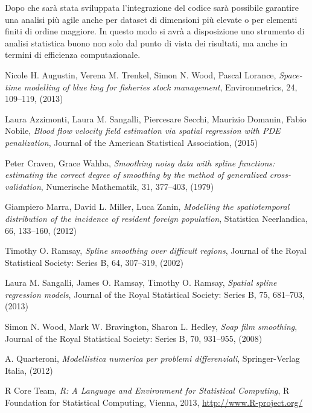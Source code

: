 \documentclass[a4paper,11pt,twoside,openright]{book}							%
\begin{document}
Dopo che sarà stata sviluppata l'integrazione del codice sarà possibile garantire una analisi più agile anche per dataset di dimensioni più elevate o per elementi finiti di ordine maggiore. In questo modo si avrà a disposizione uno strumento di analisi statistica buono non solo dal punto di vista dei risultati, ma anche in termini di efficienza computazionale.


\begin{thebibliography}{99}

Nicole H. Augustin, Verena M. Trenkel, Simon N. Wood, Pascal Lorance, \emph{Space-time modelling of blue ling for fisheries stock management}, Environmetrics, 24, 109–119, (2013)

Laura Azzimonti, Laura M. Sangalli, Piercesare Secchi, Maurizio Domanin, Fabio Nobile, \emph{Blood flow velocity field estimation via spatial regression with PDE penalization}, Journal of the American Statistical Association, (2015)

Peter Craven, Grace Wahba, \emph{Smoothing noisy data with spline functions: estimating the correct degree of smoothing by the method of generalized cross-validation}, Numerische Mathematik, 31, 377–403, (1979)

Giampiero Marra, David L. Miller, Luca Zanin, \emph{Modelling the spatiotemporal distribution of the incidence of resident foreign population}, Statistica Neerlandica, 66, 133–160, (2012)

Timothy O. Ramsay, \emph{Spline smoothing over difficult regions}, Journal of the Royal Statistical Society: Series B, 64, 307–319, (2002)

Laura M. Sangalli, James O. Ramsay, Timothy O. Ramsay, \emph{Spatial spline regression models}, Journal of the Royal Statistical Society: Series B, 75, 681–703, (2013)

Simon N. Wood, Mark W. Bravington, Sharon L. Hedley, \emph{Soap film smoothing}, Journal of the Royal Statistical Society: Series B, 70, 931–955, (2008)

A. Quarteroni, \emph{Modellistica numerica per problemi differenziali}, Springer-Verlag Italia, (2012)

R Core Team, \emph{R: A Language and Environment for Statistical Computing}, R Foundation for Statistical Computing, Vienna, 2013, \href{http://www.R-project.org/}{http://www.R-project.org/}



\end{thebibliography}
\end{document}
